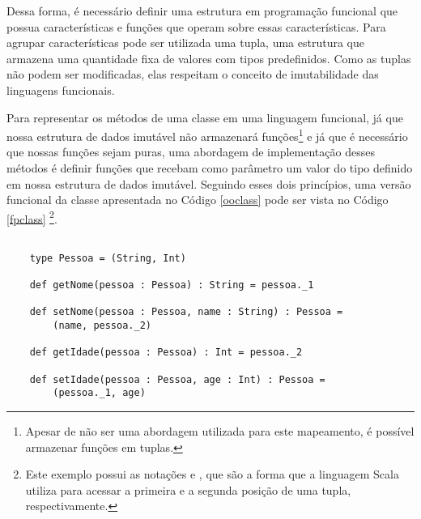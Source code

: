 Dessa forma, é necessário definir uma estrutura em 
programação funcional que possua características e 
funções que operam sobre essas características. 
Para agrupar características pode ser utilizada uma 
tupla, uma estrutura que armazena uma quantidade 
fixa de valores com tipos predefinidos\cite{tuplesscala}. 
Como as tuplas não podem ser modificadas, elas 
respeitam o conceito de imutabilidade das 
linguagens funcionais.

Para representar os métodos de uma classe em uma 
linguagem funcional, já que nossa estrutura de dados 
imutável não armazenará funções\footnote{Apesar de não 
ser uma abordagem utilizada para este mapeamento, é 
possível armazenar funções em tuplas.} e já 
que é necessário que nossas funções sejam puras, 
uma abordagem de implementação desses 
métodos é definir funções que recebam 
como parâmetro um valor do tipo definido em nossa 
estrutura de dados imutável. Seguindo esses dois 
princípios, uma versão funcional da classe apresentada 
no Código \ref{ooclass} pode ser vista no Código \ref{fpclass}
\footnote{ 
Este exemplo possui as notações \textit{} e 
\textit{}, 
que são a forma que a 
linguagem Scala utiliza para acessar a primeira e 
a segunda posição de uma tupla, respectivamente.
}.



\begin{comment}
    \footnote{
    O Código \ref{fpclass} possui as notações 
    pessoa._1 e pessoa._2, que são a forma que a 
    linguagem Scala utiliza para acessar a primeira e 
    a segunda posição de uma tupla, respectivamente.
}
    possui as notações 
\textit{._1} e \textit{._2}, que são a forma que a 
linguagem Scala utiliza para acessar a primeira e 
a segunda posição de uma tupla, respectivamente
\end{comment}

\begin{lstlisting}[caption={Representação de uma classe no contexto funcional.},label=fpclass]
    
    type Pessoa = (String, Int)

    def getNome(pessoa : Pessoa) : String = pessoa._1 

    def setNome(pessoa : Pessoa, name : String) : Pessoa = 
        (name, pessoa._2)

    def getIdade(pessoa : Pessoa) : Int = pessoa._2

    def setIdade(pessoa : Pessoa, age : Int) : Pessoa =
        (pessoa._1, age)

\end{lstlisting}


